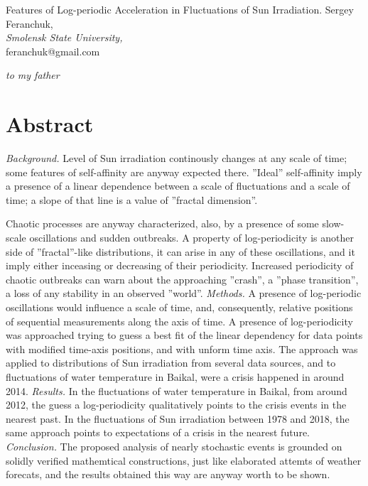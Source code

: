 \documentclass[a4paper]{article}
\begin{document}
\begin{center}
{\large{Features of Log-periodic Acceleration in Fluctuations of Sun Irradiation.}}
\vskip 12pt
Sergey Feranchuk, \\
{\small{
\textit{Smolensk State University,}\\
feranchuk@gmail.com }}
\end{center}

\begin{flushright}
{\textit{to my father}}
\end{flushright}

\section*{Abstract}

\textit{Background.} Level of Sun irradiation continously changes at any scale of time; some features of self-affinity are anyway expected there. ''Ideal'' self-affinity imply a presence of a linear dependence between a scale of fluctuations and a scale of time; a slope of that line is a value of ''fractal dimension''. 

\vskip 6pt
\noindent
Chaotic processes 
are anyway characterized, also, by a presence of some slow-scale oscillations and sudden outbreaks. A property of log-periodicity is another side of ''fractal''-like distributions, it can arise in any of these oscillations, and it imply either inceasing or decreasing of their periodicity. Increased periodicity of chaotic outbreaks can warn about the approaching ''crash'', a ''phase transition'', a loss of any stability in an observed ''world''.
\vskip 6pt
\noindent
\textit{Methods.}  A presence of log-periodic oscillations would influence a scale of time, and, consequently, relative positions of sequential measurements along the axis of time. A presence of log-periodicity was approached trying to guess a best fit of the linear dependency for data points with modified time-axis positions, and with unform time axis. The approach was applied to distributions of Sun irradiation from several data sources, and to fluctuations of water temperature in Baikal, were a crisis happened in around 2014. 
\vskip 6pt
\noindent
\textit{Results.} In the fluctuations of water temperature in Baikal, from around 2012, the guess a log-periodicity qualitatively points to the crisis events in the nearest past. In the fluctuations of Sun irradiation between 1978 and 2018, the same approach points to expectations of a crisis in the nearest future.
\vskip 6pt
\noindent
\textit{Conclusion.} The proposed analysis of nearly stochastic events is grounded on solidly verified mathemtical constructions, just like elaborated attemts of weather forecats, and the results obtained this way are anyway worth to be shown.
\end{document}
